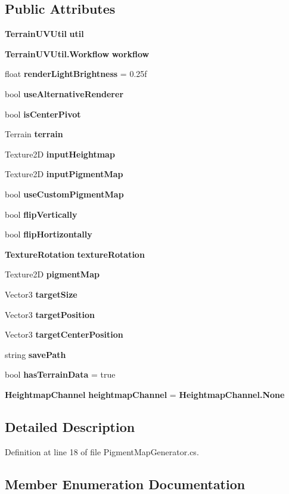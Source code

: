 \subsection*{Public Attributes}
\begin{DoxyCompactItemize}
\item 
\textbf{ Terrain\+U\+V\+Util} \textbf{ util}
\item 
\textbf{ Terrain\+U\+V\+Util.\+Workflow} \textbf{ workflow}
\item 
float \textbf{ render\+Light\+Brightness} = 0.\+25f
\item 
bool \textbf{ use\+Alternative\+Renderer}
\item 
bool \textbf{ is\+Center\+Pivot}
\item 
Terrain \textbf{ terrain}
\item 
Texture2D \textbf{ input\+Heightmap}
\item 
Texture2D \textbf{ input\+Pigment\+Map}
\item 
bool \textbf{ use\+Custom\+Pigment\+Map}
\item 
bool \textbf{ flip\+Vertically}
\item 
bool \textbf{ flip\+Hortizontally}
\item 
\textbf{ Texture\+Rotation} \textbf{ texture\+Rotation}
\item 
Texture2D \textbf{ pigment\+Map}
\item 
Vector3 \textbf{ target\+Size}
\item 
Vector3 \textbf{ target\+Position}
\item 
Vector3 \textbf{ target\+Center\+Position}
\item 
string \textbf{ save\+Path}
\item 
bool \textbf{ has\+Terrain\+Data} = true
\item 
\textbf{ Heightmap\+Channel} \textbf{ heightmap\+Channel} = \textbf{ Heightmap\+Channel.\+None}
\end{DoxyCompactItemize}


\subsection{Detailed Description}


Definition at line 18 of file Pigment\+Map\+Generator.\+cs.



\subsection{Member Enumeration Documentation}
\mbox{\label{class_f_a_e_1_1_pigment_map_generator_adc18e7ed469d0fb5f5708401ca28a4ac}} 
